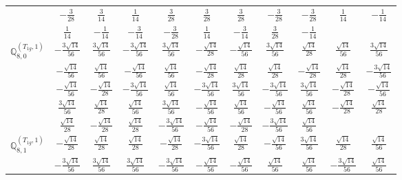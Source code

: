 \documentclass[fleqn,10pt,landscape]{article}
\begin{document}
\begin{itemize}
{\begin{center}
\begin{longtable}{ccccccccccc}
& $ - \frac{3}{28} $ & $ \frac{3}{14} $ & $ \frac{1}{14} $ & $ \frac{3}{28} $ & $ \frac{3}{28} $ & $ \frac{3}{28} $ & $ - \frac{3}{28} $ & $ - \frac{3}{28} $ & $ \frac{1}{14} $ & $ - \frac{1}{14} $ \\
& $ \frac{1}{14} $ & $ - \frac{1}{14} $ & $ - \frac{3}{14} $ & $ - \frac{3}{28} $ & $ \frac{1}{14} $ & $ - \frac{3}{14} $ & $ \frac{3}{28} $ & $ - \frac{1}{14} $ & $  $ & $  $ \\ \hline
$\mathbb{Q}_{8,0}^{(T_{1g},1)}$ & $ - \frac{3 \sqrt{14}}{56} $ & $ \frac{3 \sqrt{14}}{56} $ & $ - \frac{3 \sqrt{14}}{56} $ & $ \frac{3 \sqrt{14}}{56} $ & $ - \frac{\sqrt{14}}{28} $ & $ - \frac{\sqrt{14}}{56} $ & $ \frac{3 \sqrt{14}}{56} $ & $ \frac{\sqrt{14}}{28} $ & $ \frac{\sqrt{14}}{56} $ & $ \frac{3 \sqrt{14}}{56} $ \\
& $ - \frac{\sqrt{14}}{56} $ & $ \frac{\sqrt{14}}{56} $ & $ - \frac{\sqrt{14}}{56} $ & $ \frac{\sqrt{14}}{56} $ & $ - \frac{\sqrt{14}}{28} $ & $ \frac{\sqrt{14}}{28} $ & $ \frac{\sqrt{14}}{28} $ & $ - \frac{\sqrt{14}}{28} $ & $ \frac{\sqrt{14}}{28} $ & $ - \frac{3 \sqrt{14}}{56} $ \\
& $ - \frac{\sqrt{14}}{56} $ & $ - \frac{\sqrt{14}}{28} $ & $ - \frac{3 \sqrt{14}}{56} $ & $ \frac{\sqrt{14}}{56} $ & $ - \frac{3 \sqrt{14}}{56} $ & $ \frac{3 \sqrt{14}}{56} $ & $ - \frac{3 \sqrt{14}}{56} $ & $ \frac{3 \sqrt{14}}{56} $ & $ - \frac{\sqrt{14}}{28} $ & $ - \frac{\sqrt{14}}{56} $ \\
& $ \frac{3 \sqrt{14}}{56} $ & $ \frac{\sqrt{14}}{28} $ & $ \frac{\sqrt{14}}{56} $ & $ \frac{3 \sqrt{14}}{56} $ & $ - \frac{\sqrt{14}}{56} $ & $ \frac{\sqrt{14}}{56} $ & $ - \frac{\sqrt{14}}{56} $ & $ \frac{\sqrt{14}}{56} $ & $ - \frac{\sqrt{14}}{28} $ & $ \frac{\sqrt{14}}{28} $ \\
& $ \frac{\sqrt{14}}{28} $ & $ - \frac{\sqrt{14}}{28} $ & $ \frac{\sqrt{14}}{28} $ & $ - \frac{3 \sqrt{14}}{56} $ & $ - \frac{\sqrt{14}}{56} $ & $ - \frac{\sqrt{14}}{28} $ & $ - \frac{3 \sqrt{14}}{56} $ & $ \frac{\sqrt{14}}{56} $ & $  $ & $  $ \\ \hline
$\mathbb{Q}_{8,1}^{(T_{1g},1)}$ & $ - \frac{\sqrt{14}}{28} $ & $ \frac{\sqrt{14}}{28} $ & $ \frac{\sqrt{14}}{28} $ & $ - \frac{\sqrt{14}}{28} $ & $ - \frac{3 \sqrt{14}}{56} $ & $ \frac{\sqrt{14}}{28} $ & $ - \frac{\sqrt{14}}{56} $ & $ \frac{3 \sqrt{14}}{56} $ & $ \frac{\sqrt{14}}{28} $ & $ \frac{\sqrt{14}}{56} $ \\
& $ - \frac{3 \sqrt{14}}{56} $ & $ \frac{3 \sqrt{14}}{56} $ & $ \frac{3 \sqrt{14}}{56} $ & $ - \frac{3 \sqrt{14}}{56} $ & $ - \frac{\sqrt{14}}{56} $ & $ - \frac{\sqrt{14}}{56} $ & $ \frac{\sqrt{14}}{56} $ & $ \frac{\sqrt{14}}{56} $ & $ - \frac{3 \sqrt{14}}{56} $ & $ \frac{\sqrt{14}}{56} $ \\

\end{longtable}
\end{center}}
\end{itemize}
\end{document}
